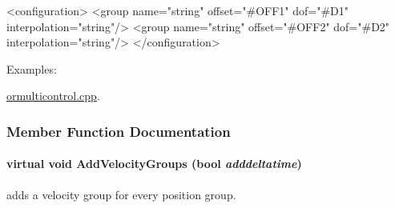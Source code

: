 \begin{DoxyCode}
   <configuration>
     <group name="string" offset="#OFF1" dof="#D1" interpolation="string"/>
     <group name="string" offset="#OFF2" dof="#D2" interpolation="string"/>
   </configuration>
\end{DoxyCode}
 \begin{Desc}
\item[Examples: ]\par


\hyperlink{ormulticontrol_8cpp-example}{ormulticontrol.cpp}.

\end{Desc}


\subsubsection{Member Function Documentation}
\hypertarget{classOpenRAVE_1_1ConfigurationSpecification_a87498a23beea02e83fd8ddc062898cb3}{
\paragraph[{AddVelocityGroups}]{\setlength{\rightskip}{0pt plus 5cm}virtual void AddVelocityGroups (bool {\em adddeltatime})}\hfill}
\label{classOpenRAVE_1_1ConfigurationSpecification_a87498a23beea02e83fd8ddc062898cb3}


adds a velocity group for every position group. 

